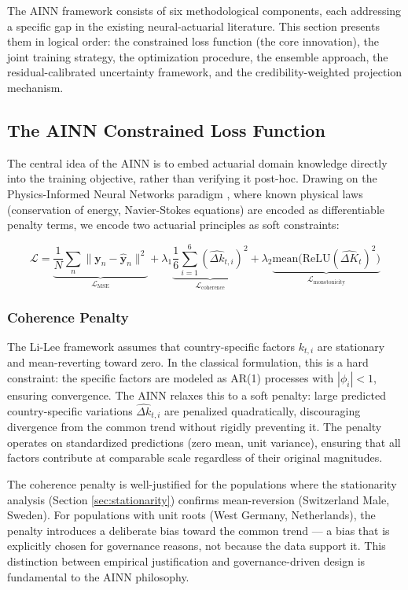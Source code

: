 \documentclass[11pt,a4paper]{article}
\begin{document}
The AINN framework consists of six methodological components, each addressing a specific gap in the existing neural-actuarial literature. This section presents them in logical order: the constrained loss function (the core innovation), the joint training strategy, the optimization procedure, the ensemble approach, the residual-calibrated uncertainty framework, and the credibility-weighted projection mechanism.

\subsection{The AINN Constrained Loss Function}

The central idea of the AINN is to embed actuarial domain knowledge directly into the training objective, rather than verifying it post-hoc. Drawing on the Physics-Informed Neural Networks paradigm \cite{raissi2019pinn}, where known physical laws (conservation of energy, Navier-Stokes equations) are encoded as differentiable penalty terms, we encode two actuarial principles as soft constraints:

\begin{equation}\label{eq:ainn_loss}
    \mathcal{L} = \underbrace{\frac{1}{N}\sum_{n} \| \mathbf{y}_n - \hat{\mathbf{y}}_n \|^2}_{\mathcal{L}_{\text{MSE}}} + \lambda_1 \underbrace{\frac{1}{6}\sum_{i=1}^{6} (\hat{\Delta k}_{t,i})^2}_{\mathcal{L}_{\text{coherence}}} + \lambda_2 \underbrace{\text{mean}\big(\text{ReLU}(\hat{\Delta K}_t)^2\big)}_{\mathcal{L}_{\text{monotonicity}}}
\end{equation}

\subsubsection{Coherence Penalty}

The Li-Lee framework assumes that country-specific factors $k_{t,i}$ are stationary and mean-reverting toward zero. In the classical formulation, this is a hard constraint: the specific factors are modeled as AR(1) processes with $|\phi_i| < 1$, ensuring convergence. The AINN relaxes this to a soft penalty: large predicted country-specific variations $\hat{\Delta k}_{t,i}$ are penalized quadratically, discouraging divergence from the common trend without rigidly preventing it. The penalty operates on standardized predictions (zero mean, unit variance), ensuring that all factors contribute at comparable scale regardless of their original magnitudes.

The coherence penalty is well-justified for the populations where the stationarity analysis (Section \ref{sec:stationarity}) confirms mean-reversion (Switzerland Male, Sweden). For populations with unit roots (West Germany, Netherlands), the penalty introduces a deliberate bias toward the common trend --- a bias that is explicitly chosen for governance reasons, not because the data support it. This distinction between empirical justification and governance-driven design is fundamental to the AINN philosophy.
\end{document}
